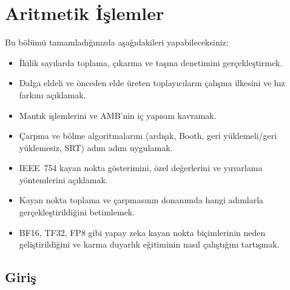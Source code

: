 ﻿%

\chapter{Aritmetik İşlemler}
\label{chap:aritmetik}


\begin{tcolorbox}[
    colframe=sinyalyesil!60!black,
    title={\textbf{Öğrenme Hedefleri}},
    fonttitle=\bfseries,
    rounded corners,
    boxrule=0.8pt
]
Bu bölümü tamamladığınızda aşağıdakileri yapabileceksiniz:
\begin{itemize}[nosep, leftmargin=*]
    \item İkilik sayılarda toplama, çıkarma ve taşma denetimini gerçekleştirmek.
    \item Dalga eldeli ve önceden elde üreten toplayıcıların çalışma ilkesini ve hız farkını açıklamak.
    \item Mantık işlemlerini ve AMB'nin iç yapısını kavramak.
    \item Çarpma ve bölme algoritmalarını (ardışık, Booth, geri yüklemeli/geri yüklemesiz, SRT) adım adım uygulamak.
    \item IEEE~754 kayan nokta gösterimini, özel değerlerini ve yuvarlama yöntemlerini açıklamak.
    \item Kayan nokta toplama ve çarpmasının donanımda hangi adımlarla gerçekleştirildiğini betimlemek.
    \item BF16, TF32, FP8 gibi yapay zeka kayan nokta biçimlerinin neden geliştirildiğini ve karma duyarlık eğitiminin nasıl çalıştığını tartışmak.
\end{itemize}
\end{tcolorbox}

\section*{Giriş}

